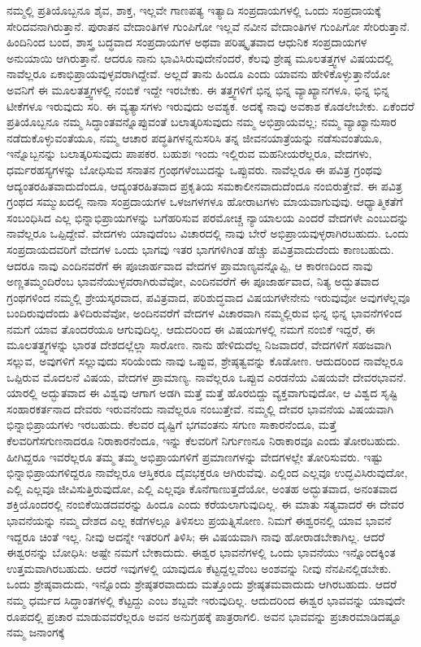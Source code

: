 ನಮ್ಮಲ್ಲಿ ಪ್ರತಿಯೊಬ್ಬನೂ ಶೈವ, ಶಾಕ್ತ, ಇಲ್ಲವೇ ಗಾಣಪತ್ಯ ಇತ್ಯಾದಿ ಸಂಪ್ರದಾಯಗಳಲ್ಲಿ ಒಂದು ಸಂಪ್ರದಾಯಕ್ಕೆ ಸೇರಿದವನಾಗಿರುತ್ತಾನೆ. ಪುರಾತನ ವೇದಾಂತಿಗಳ ಗುಂಪಿಗೋ ಇಲ್ಲವೆ ನವೀನ ವೇದಾಂತಿಗಳ ಗುಂಪಿಗೋ ಸೇರಿರುತ್ತಾನೆ. ಹಿಂದಿನಿಂದ ಬಂದ, ಶಾಸ್ತ್ರ ಬದ್ಧವಾದ ಸಂಪ್ರದಾಯಗಳ ಅಥವಾ ಪರಿಷ್ಕೃತವಾದ ಆಧುನಿಕ ಸಂಪ್ರದಾಯಗಳ ಅನುಯಾಯಿ ಆಗಿರುತ್ತಾನೆ. ಆದರೂ ನಾನು ಭಾವಿಸಿರುವುದೇನೆಂದರೆ, ಕೆಲವು ಶ್ರೇಷ್ಠ ಮೂಲತತ್ತ್ವಗಳ ವಿಷಯದಲ್ಲಿ ನಾವೆಲ್ಲರೂ ಏಕಾಭಿಪ್ರಾಯವುಳ್ಳವರಾಗಿದ್ದೇವೆ. ಅಲ್ಲದೆ ತಾನು ಹಿಂದೂ ಎಂದು ಯಾವನು ಹೇಳಿಕೊಳ್ಳುತ್ತಾನೆಯೋ ಅವನಿಗೆ ಈ ಮೂಲತತ್ತ್ವಗಳಲ್ಲಿ ನಂಬಿಕೆ ಇದ್ದೇ ಇರಬೇಕು. ಈ ತತ್ತ್ವಗಳಿಗೆ ಭಿನ್ನ ಭಿನ್ನ ವ್ಯಾಖ್ಯಾನಗಳೂ, ಭಿನ್ನ ಭಿನ್ನ ಟೀಕೆಗಳೂ ಇರುವುದು ಸರಿ. ಈ ವ್ಯತ್ಯಾಸಗಳು ಇರುವುದು ಅವಶ್ಯಕ. ಅದಕ್ಕೆ ನಾವು ಅವಕಾಶ ಕೊಡಲೇಬೇಕು. ಏಕೆಂದರೆ ಪ್ರತಿಯೊಬ್ಬನೂ ನಮ್ಮ ಸಿದ್ಧಾಂತವನ್ನೊಪ್ಪುವಂತೆ ಬಲಾತ್ಕರಿಸುವುದು ನಮ್ಮ ಅಭಿಪ್ರಾಯವಲ್ಲ; ನಮ್ಮ ವ್ಯಾಖ್ಯಾನುಸಾರ ನಡೆದುಕೊಳ್ಳುವಂತೆಯೂ, ನಮ್ಮ ಆಚಾರ ಪದ್ಧತಿಗಳನ್ನನುಸರಿಸಿ ತನ್ನ ಜೀವನಯಾತ್ರೆಯನ್ನು ನಡೆಸುವಂತೆಯೂ, ಇನ್ನೊಬ್ಬನನ್ನು ಬಲಾತ್ಕರಿಸುವುದು ಪಾಪಕರ. ಬಹುಶಃ ಇಂದು ಇಲ್ಲಿರುವ ಮಹನೀಯರೆಲ್ಲರೂ, ವೇದಗಳು, ಧರ್ಮರಹಸ್ಯಗಳನ್ನು ಬೋಧಿಸುವ ಸನಾತನ ಗ್ರಂಥಗಳೆಂಬುದನ್ನು ಒಪ್ಪುವರು. ನಾವೆಲ್ಲರೂ ಈ ಪವಿತ್ರ ಗ್ರಂಥವು ಆದ್ಯಂತರಹಿತವಾದುದೆಂದೂ, ಆದ್ಯಂತರಹಿತವಾದ ಪ್ರಕೃತಿಯ ಸಮಕಾಲೀನವಾದುದೆಂದೂ ನಂಬಿರುತ್ತೇವೆ. ಈ ಪವಿತ್ರ ಗ್ರಂಥದ ಸಮ್ಮುಖದಲ್ಲಿ ನಾನಾ ಸಂಪ್ರದಾಯಗಳ ಒಳಜಗಳಗಳೂ ಹೋರಾಟಗಳು ಮಾಯವಾಗುವುವು. ಆಧ್ಯಾತ್ಮಿಕತೆಗೆ ಸಂಬಂಧಿಸಿದ ಎಲ್ಲ ಭಿನ್ನಾಭಿಪ್ರಾಯಗಳನ್ನು ಬಗೆಹರಿಸುವ ಪರಮೋಚ್ಚ ನ್ಯಾಯಾಲಯ ಎಂದರೆ ವೇದಗಳೇ ಎಂಬುದನ್ನು ನಾವೆಲ್ಲರೂ ಒಪ್ಪಿದ್ದೇವೆ. ವೇದಗಳು ಯಾವುದೆಂಬ ವಿಚಾರದಲ್ಲಿ ನಾವು ಬೇರೆ ಅಭಿಪ್ರಾಯವುಳ್ಳರಾಗಿರಬಹುದು. ಒಂದು ಸಂಪ್ರದಾಯದವರಿಗೆ ವೇದಗಳ ಒಂದು ಭಾಗವು ಇತರ ಭಾಗಗಳಿಗಿಂತ ಹೆಚ್ಚು ಪವಿತ್ರವಾದುದೆಂದು ಕಾಣಬಹುದು. ಆದರೂ ನಾವು ಎಂದಿನವರೆಗೆ ಈ ಪೂಜಾರ್ಹವಾದ ವೇದಗಳ ಪ್ರಾಮಾಣ್ಯವನ್ನೊಪ್ಪಿ, ಆ ಕಾರಣದಿಂದ ನಾವು ಅಣ್ಣತಮ್ಮಂದಿರೆಂಬ ಭಾವನೆಯುಳ್ಳವರಾಗಿರುವೆವೋ, ಎಂದಿನವರೆಗೆ ಈ ಪೂಜಾರ್ಹವಾದ, ನಿತ್ಯ ಅದ್ಭುತವಾದ ಗ್ರಂಥಗಳಿಂದ ನಮ್ಮಲ್ಲಿ ಶ್ರೇಯಸ್ಕರವಾದ, ಪವಿತ್ರವಾದ, ಪರಿಶುದ್ಧವಾದ ವಿಷಯಗಳೇನೇನು ಇರುವುವೋ ಅವುಗಳೆಲ್ಲವೂ ಬಂದಿರುವುದೆಂದು ತಿಳಿದಿರುವೆವೋ, ಅಂದಿನವರೆಗೆ ವೇದಗಳ ವಿಚಾರವಾಗಿ ನಮ್ಮಲ್ಲಿರುವ ಭಿನ್ನ ಭಿನ್ನ ಭಾವನೆಗಳಿಂದ ನಮಗೆ ಯಾವ ತೊಂದರೆಯೂ ಆಗುವುದಿಲ್ಲ. ಆದುದರಿಂದ ಈ ವಿಷಯಗಳಲ್ಲಿ ನಮಗೆ ನಂಬಿಕೆ ಇದ್ದರೆ, ಈ ಮೂಲತತ್ತ್ವಗಳನ್ನು ಭಾರತ ದೇಶದಲ್ಲೆಲ್ಲಾ ಸಾರೋಣ. ನಾನು ಹೇಳಿದುದೆಲ್ಲ ನಿಜವಾದರೆ, ವೇದಗಳಿಗೆ ಸಹಜವಾಗಿ ಸಲ್ಲುವ, ಅವುಗಳಿಗೆ ಸಲ್ಲುವುದು ಸರಿಯೆಂದು ನಾವು ಒಪ್ಪುವ, ಶ್ರೇಷ್ಠತ್ವವನ್ನು ಕೊಡೋಣ. ಆದುದರಿಂದ ನಾವೆಲ್ಲರೂ ಒಪ್ಪಿರುವ ಮೊದಲನೆ ವಿಷಯ, ವೇದಗಳ ಪ್ರಾಮಾಣ್ಯ. ನಾವೆಲ್ಲರೂ ಒಪ್ಪುವ ಎರಡನೆಯ ವಿಷಯವೇ ದೇವರಭಾವನೆ. ಯಾರಲ್ಲಿ ಅದ್ಭುತವಾದ ಈ ವಿಶ್ವವು ಆಗಾಗ ಅಡಗಿ ಮತ್ತೆ ಮತ್ತೆ ಹೊರಬಿದ್ದು ವ್ಯಕ್ತವಾಗುವುದೋ, ಆ ವಿಶ್ವದ ಸೃಷ್ಟಿ ಸಂಹಾರಕರ್ತನಾದ ದೇವರು ಇರುವನೆಂದು ನಾವೆಲ್ಲರೂ ನಂಬುತ್ತೇವೆ. ನಮ್ಮಲ್ಲಿ ದೇವರ ಭಾವನೆಯ ವಿಷಯವಾಗಿ ಭಿನ್ನಾಭಿಪ್ರಾಯಗಳು ಇರಬಹುದು. ಕೆಲವರ ದೃಷ್ಟಿಗೆ ಭಗವಂತನು ಸಗುಣ ಸಾಕಾರನೆಂದೂ, ಮತ್ತೆ ಕೆಲವರಿಗೆ\break ಸಗುಣನಾದರೂ ನಿರಾಕಾರನೆಂದೂ, ಇನ್ನು ಕೆಲವರಿಗೆ ನಿರ್ಗುಣನೂ ನಿರಾಕಾರವೂ ಎಂದು ತೋರಬಹುದು. ಹೀಗಿದ್ದರೂ ಇವರೆಲ್ಲರೂ ತಮ್ಮ ತಮ್ಮ ಅಭಿಪ್ರಾಯಗಳಿಗೆ ಪ್ರಮಾಣಗಳನ್ನು ವೇದಗಳಲ್ಲೇ ತೋರಿಸುವರು. ಇಷ್ಟು ಭಿನ್ನಾಭಿಪ್ರಾಯಗಳಿದ್ದರೂ ನಾವೆಲ್ಲರೂ ಆಸ್ತಿಕರೂ ದೈವಭಕ್ತರೂ ಆಗಿರುವೆವು. ಎಲ್ಲಿಂದ ಎಲ್ಲವೂ ಉದ್ಭವಿಸಿರುವುದೋ, ಎಲ್ಲಿ ಎಲ್ಲವೂ ಜೀವಿಸುತ್ತಿರುವುದೋ, ಎಲ್ಲಿ ಎಲ್ಲವೂ ಕೊನೆಗಾಣುತ್ತದೆಯೋ, ಅಂತಹ ಅದ್ಭುತವಾದ, ಅನಂತವಾದ ಶಕ್ತಿಯೊಂದರಲ್ಲಿ ನಂಬಿಕೆಯಿಡದವರನ್ನು ಹಿಂದೂ ಎಂದು ಕರೆಯಲಾಗುವುದಿಲ್ಲ. ಈ ಮಾತು ಸತ್ಯವಾದರೆ ಈ ದೇವರ ಭಾವನೆಯನ್ನು ನಮ್ಮ ದೇಶದ ಎಲ್ಲ ಕಡೆಗಳಲ್ಲೂ ತಿಳಿಸಲು ಪ್ರಯತ್ನಿಸೋಣ. ನಿಮಗೆ ಈಶ್ವರನಲ್ಲಿ ಯಾವ ಭಾವನೆ ಇದ್ದರೂ ಚಿಂತೆ ಇಲ್ಲ. ನೀವು ಅದನ್ನೇ ಇತರರಿಗೆ ತಿಳಿಸಿ; ಈ ವಿಷಯವಾಗಿ ನಾವು ಹೋರಾಡಬೇಕಾಗಿಲ್ಲ. ಆದರೆ ಈಶ್ವರನನ್ನು ಬೋಧಿಸಿ: ಅಷ್ಟೇ ನಮಗೆ ಬೇಕಾದುದು. ಈಶ್ವರ ಭಾವನೆಗಳಲ್ಲಿ ಒಂದು ಭಾವನೆಯು ಇನ್ನೊಂದಕ್ಕಿಂತ ಉತ್ತಮವಾಗಿರಬಹುದು. ಆದರೆ ಇವುಗಳಲ್ಲಿ ಯಾವುದೂ ಕೆಟ್ಟದ್ದಲ್ಲವೆಂಬ ಅಂಶವನ್ನು ನೀವು ನೆನಪಿನಲ್ಲಿಡಬೇಕು. ಒಂದು ಶ್ರೇಷ್ಠವಾದುದು, ಇನ್ನೊಂದು ಶ್ರೇಷ್ಠತರವಾದುದು ಮತ್ತೊಂದು ಶ್ರೇಷ್ಠತಮವಾದುದು ಆಗಿರಬಹುದು. ಆದರೆ ನಮ್ಮ ಧರ್ಮದ ಸಿದ್ಧಾಂತಗಳಲ್ಲಿ ಕೆಟ್ಟದ್ದು ಎಂಬ ಶಬ್ದವೇ ಇರುವುದಿಲ್ಲ. ಆದುದರಿಂದ ಈಶ್ವರ ಭಾವವನ್ನು ಯಾವುದೇ ರೂಪದಲ್ಲಿ ಪ್ರಚಾರ ಮಾಡುವವರೆಲ್ಲರೂ ಅವನ ಅನುಗ್ರಹಕ್ಕೆ ಪಾತ್ರರಾಗಲಿ. ಅವನ ಭಾವವನ್ನು ಪ್ರಚಾರಮಾಡಿದಷ್ಟೂ ನಮ್ಮ ಜನಾಂಗಕ್ಕೆ 